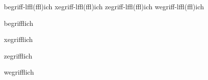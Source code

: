 
\startexceptions[de]
begri{ff-}{l}{ffl}(f\zwj fl)ich
xegri{ff-}{l}{ffl}(ff\zwj l)ich
zegri{ff-}{l}{ffl}(ffl)ich
wegri{ff-}{l}{ffl}(f\zwj f\zwj l)ich
\stopexceptions

\showglyphs

\mainlanguage[de]

\startTEXpage[offset=10pt]
    begrifflich\par
    xegrifflich\par
    zegrifflich\par
    wegrifflich\par
\stopTEXpage
